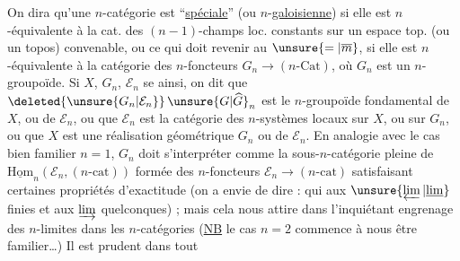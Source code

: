 On dira qu'une $n$-catégorie  est ``\uline{spéciale}'' (ou $n$-\uline{galoisienne}) si elle est $n$-équivalente à la cat. des $(n-1)$-champs loc. constants sur un espace top. (ou un topos) convenable, ou ce qui doit revenir au $\unsure{=|\overline m}$, si elle est $n$-équivalente à la catégorie des $n$-foncteurs $G_n\longrightarrow(n\text{-}\mathrm{Cat})$, où $G_n$ est un $n$-groupoïde. Si $X$, $G_n$, $\mathcal E_n$ se  ainsi, on dit que $\deleted{\unsure{G_n|\mathcal E_n}}\,\unsure{G|\widehat G}_n$ est le $n$-groupoïde fondamental de $X$, ou de $\mathcal E_n$, ou que $\mathcal E_n$ est la catégorie des $n$-systèmes locaux sur $X$, ou sur $G_n$, ou que $X$ est une réalisation géométrique  $G_n$ ou de $\mathcal E_n$. En analogie avec le cas bien familier $n=1$, $G_n$ doit s'interpréter comme la sous-$n$-catégorie pleine de $\underline{\mathrm{Hom}}_n(\mathcal E_n,(n\text{-}\mathrm{cat}))$ formée des $n$-foncteurs $\mathcal E_n\to(n\text{-}\mathrm{cat})$ satisfaisant certaines propriétés d'exactitude (on a envie de dire : qui  aux $\unsure{\varprojlim|\underline{\lim}}$ finies et aux $\varinjlim$ quelconques) ; mais cela nous attire dans l'inquiétant engrenage des $n$-limites dans les $n$-catégories (\uline{NB} le cas $n=2$ commence à nous être familier\ldots) Il est prudent dans tout
